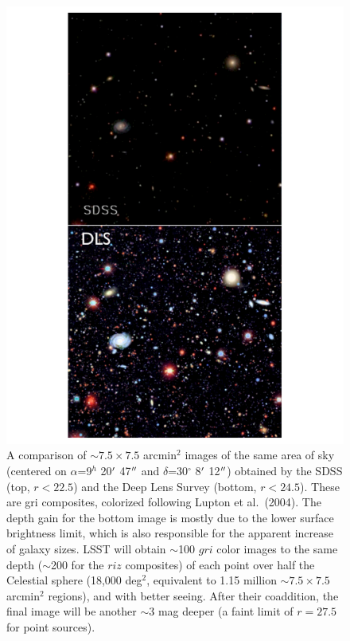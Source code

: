 \documentclass{emulateapj}
\begin{document}
\begin{figure}
\hskip -0.8in
\includegraphics[width=1.5\hsize,clip]{panels1_2.pdf}
\caption{A comparison of $\sim7.5\times7.5$ arcmin$^2$ images of
the same area of sky (centered on $\alpha$=9$^h$ 20$\mbox{$^\prime$}$ 47$\mbox{$^{\prime\prime}$}$ and 
$\delta$=30$^\circ$ 8$\mbox{$^\prime$}$ 12$\mbox{$^{\prime\prime}$}$) obtained by the SDSS (top, $r<22.5$) and 
the Deep Lens Survey (bottom, $r<24.5$). These are gri composites,
colorized following Lupton et al.~(2004).  The depth gain for the bottom image
is mostly due to the lower surface brightness limit, which is also responsible 
for the apparent increase of galaxy sizes. LSST will obtain $\sim$100 $gri$ 
color images to the same depth ($\sim$200 for the $riz$ composites) of each point 
over half the Celestial sphere (18,000 deg$^2$, equivalent to 1.15 million $\sim7.5\times7.5$
arcmin$^2$ regions), and with better seeing. After their coaddition, the final 
image will be another $\sim3$ mag deeper (a faint limit of $r=27.5$ for point 
sources).} 
\label{Fig:panels1}
\end{figure}
\end{document}
